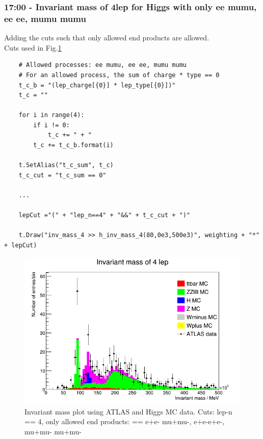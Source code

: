 \subsubsection*{17:00 - Invariant mass of 4lep for Higgs with only ee mumu, ee ee, mumu mumu}
Adding the cuts such that only allowed end products are allowed.
\\
Cuts used in Fig.\ref{fig:17:00_02-03-21}
\begin{lstlisting}
    # Allowed processes: ee mumu, ee ee, mumu mumu
    # For an allowed process, the sum of charge * type == 0 
    t_c_b = "(lep_charge[{0}] * lep_type[{0}])"  
    t_c = ""
    
    for i in range(4):
        if i != 0:
            t_c += " + "
        t_c += t_c_b.format(i)

    t.SetAlias("t_c_sum", t_c)
    t_c_cut = "t_c_sum == 0"
    
    ...
    
    lepCut ="(" + "lep_n==4" + "&&" + t_c_cut + ")"
    
    t.Draw("inv_mass_4 >> h_inv_mass_4(80,0e3,500e3)", weighting + "*" + lepCut)
\end{lstlisting}
\begin{figure}[h!]
    \centering
	\includegraphics[width=0.85\linewidth]{plots/02-03-2021/17-00.png}
    \caption{Invariant mass plot using ATLAS and Higgs MC data.  Cuts: lep-n == 4, only allowed end products: == e+e- mu+mu-, e+e-e+e-, mu+mu- mu+mu-}
    \label{fig:17:00_02-03-21}
\end{figure}

